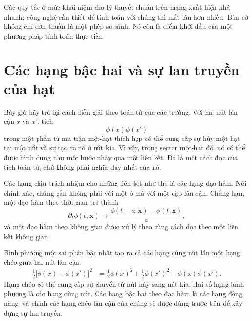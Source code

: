 Các quy tắc ở mức khái niệm cho lý thuyết chuẩn trên mạng xuất hiện khá nhanh; công nghệ cần thiết để tính toán với chúng thì mất lâu hơn nhiều. Bàn cờ không chỉ đơn thuần là một phép so sánh. Nó còn là điểm khởi đầu của một phương pháp tính toán thực tiễn.

\section{Các hạng bậc hai và sự lan truyền của hạt}

Bây giờ hãy trở lại cách diễn giải theo toán tử của các trường. Với hai nút lân cận \(x\) và \(x'\), tích
\begin{equation}
\phi(x)\phi(x')
\end{equation}
trong một phần tử ma trận một-hạt thích hợp có thể cung cấp sự hủy một hạt tại một nút và sự tạo ra nó ở nút kia. Vì vậy, trong sector một-hạt đó, nó có thể được hình dung như một bước nhảy qua một liên kết. Đó là một cách đọc của tích toán tử, chứ không phải nghĩa duy nhất của nó.

Các hạng chịu trách nhiệm cho những liên kết như thế là các hạng đạo hàm. Nói chính xác, chúng gắn không phải với một ô mà với một cặp lân cận. Chẳng hạn, một đạo hàm theo thời gian trở thành
\begin{equation}
\partial_t\phi(t,\mathbf{x})
\longrightarrow
\frac{\phi(t+a,\mathbf{x})-\phi(t,\mathbf{x})}{a},
\end{equation}
và một đạo hàm theo không gian được xử lý theo cùng cách dọc theo một liên kết không gian.

\begin{classroomqa}
\end{classroomqa}

Bình phương một sai phân bậc nhất tạo ra cả các hạng cùng nút lẫn một hạng chéo giữa hai nút lân cận:
\begin{align}
\frac{1}{2}\bigl[\phi(x)-\phi(x')\bigr]^2
&=
\frac{1}{2}\phi(x)^2
+\frac{1}{2}\phi(x')^2
-\phi(x)\phi(x').
\end{align}
Hạng chéo có thể cung cấp sự chuyển từ nút này sang nút kia. Hai số hạng bình phương là các hạng cùng nút. Các hạng bậc hai theo đạo hàm là các hạng động năng, và chính các hạng chéo lân cận của chúng sẽ được dùng trước tiên để xây dựng sự lan truyền.

